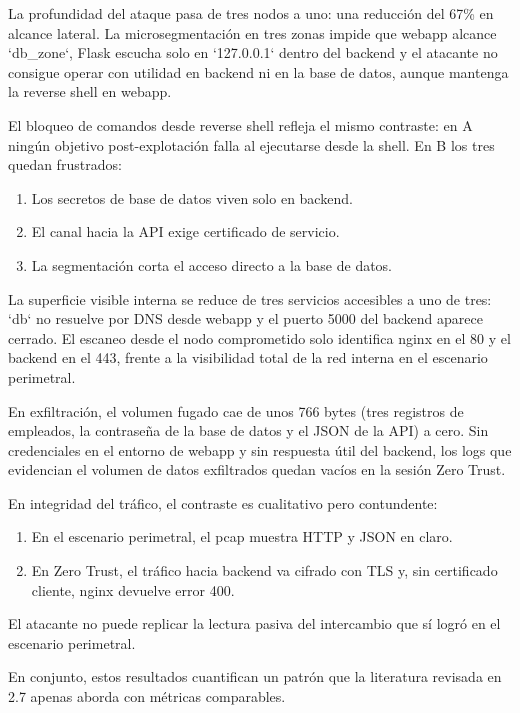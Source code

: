 \documentclass[11pt,spanish,listoffigures,listoftables]{tfgetsinf}
\begin{document}
        La profundidad del ataque pasa de tres nodos a uno: una reducción del 67\% en alcance lateral. La microsegmentación en tres zonas impide que webapp alcance `db\_zone`, Flask escucha solo en `127.0.0.1` dentro del backend y el atacante no consigue operar con utilidad en backend ni en la base de datos, aunque mantenga la reverse shell en webapp.
        
        El bloqueo de comandos desde reverse shell refleja el mismo contraste: en A ningún objetivo post-explotación falla al ejecutarse desde la shell. En B los tres quedan frustrados:
        \begin{enumerate}
            \item Los secretos de base de datos viven solo en backend.
            \item El canal hacia la API exige certificado de servicio.
            \item La segmentación corta el acceso directo a la base de datos.
        \end{enumerate}
        
        La superficie visible interna se reduce de tres servicios accesibles a uno de tres: `db` no resuelve por DNS desde webapp y el puerto 5000 del backend aparece cerrado. El escaneo desde el nodo comprometido solo identifica nginx en el 80 y el backend en el 443, frente a la visibilidad total de la red interna en el escenario perimetral.
        
        En exfiltración, el volumen fugado cae de unos 766 bytes (tres registros de empleados, la contraseña de la base de datos y el JSON de la API) a cero. Sin credenciales en el entorno de webapp y sin respuesta útil del backend, los logs que evidencian el volumen de datos exfiltrados quedan vacíos en la sesión Zero Trust.
        
        En integridad del tráfico, el contraste es cualitativo pero contundente:
        \begin{enumerate}
            \item En el escenario perimetral, el pcap muestra HTTP y JSON en claro.
            \item En Zero Trust, el tráfico hacia backend va cifrado con TLS y, sin certificado cliente, nginx devuelve error 400.
        \end{enumerate}
        
        El atacante no puede replicar la lectura pasiva del intercambio que sí logró en el escenario perimetral.
        
        En conjunto, estos resultados cuantifican un patrón que la literatura revisada en 2.7 apenas aborda con métricas comparables.
\end{document}
